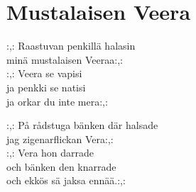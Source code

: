 \section{Mustalaisen Veera}
:,: Raastuvan penkillä halasin\\
minä mustalaisen Veeraa:,:\\
:,: Veera se vapisi\\
ja penkki se natisi\\
ja orkar du inte mera:,:

:,: På rådstuga bänken där halsade\\
jag zigenarflickan Vera:,:\\
:,: Vera hon darrade\\
och bänken den knarrade\\
och ekkös sä jaksa ennää.:,: